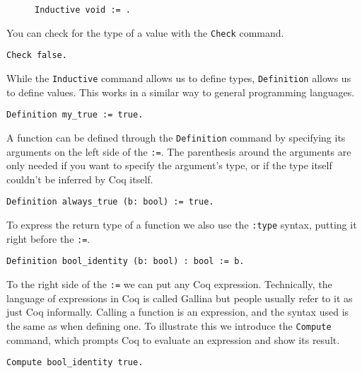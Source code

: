 \begin{figure}[!ht]
\begin{verbatim}
Inductive void := .
\end{verbatim}
\label{lst:void}
\end{figure}

You can check for the type of a value with the \texttt{Check} command.

\begin{verbatim}
Check false. 
\end{verbatim}

While the \texttt{Inductive} command allows us to define types, \texttt{Definition}
allows us to define values. This works in a similar way to general programming languages.

\begin{verbatim}
Definition my_true := true.
\end{verbatim}

A function can be defined through the \texttt{Definition} command by specifying its arguments on
the left side of the \texttt{:=}. The parenthesis around the arguments are only needed if you 
want to specify the argument's type, or if the type itself couldn't be inferred by Coq itself.

\begin{verbatim}
Definition always_true (b: bool) := true.
\end{verbatim}

To express the return type of a function we also use the \texttt{:type} syntax, putting it 
right before the \texttt{:=}.

\begin{verbatim}
Definition bool_identity (b: bool) : bool := b.
\end{verbatim}

To the right side of the \texttt{:=} we can put any Coq expression. Technically, the language of
expressions in Coq is called Gallina
but people usually refer to it as just Coq informally. Calling a function is an expression, and the syntax
used is the same as when defining one. To illustrate this we introduce the \texttt{Compute}
command, which prompts Coq to evaluate an expression and show its result. 

\begin{verbatim}
Compute bool_identity true.
\end{verbatim}


